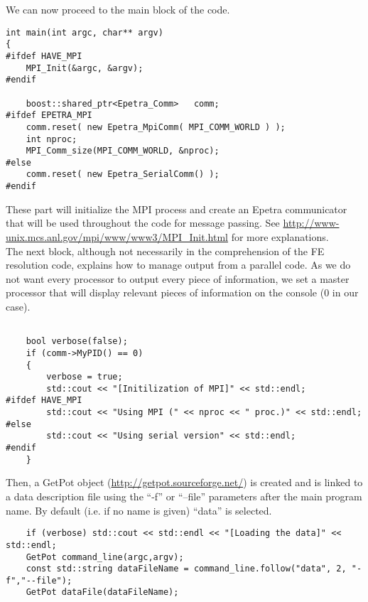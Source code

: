 We can now proceed to the main block of the code.

\begin{verbatim}
int main(int argc, char** argv)
{
#ifdef HAVE_MPI
    MPI_Init(&argc, &argv);
#endif

    boost::shared_ptr<Epetra_Comm>   comm;
#ifdef EPETRA_MPI
    comm.reset( new Epetra_MpiComm( MPI_COMM_WORLD ) );
    int nproc;
    MPI_Comm_size(MPI_COMM_WORLD, &nproc);
#else
    comm.reset( new Epetra_SerialComm() );
#endif
\end{verbatim}

\noindent These part will initialize the MPI process and create an Epetra communicator
that will be used throughout the code for message passing. See
\url{http://www-unix.mcs.anl.gov/mpi/www/www3/MPI\_Init.html}
for more explanations.\\

The next block, although not necessarily in the comprehension of the FE resolution code, explains
how to manage output from a parallel code. As we do not want every processor to output
every piece of information, we set a master processor that will display relevant
pieces of information on the console ($0$ in our case).

\begin{verbatim}

    bool verbose(false);
    if (comm->MyPID() == 0)
    {
        verbose = true;
        std::cout << "[Initilization of MPI]" << std::endl;
#ifdef HAVE_MPI
        std::cout << "Using MPI (" << nproc << " proc.)" << std::endl;
#else
        std::cout << "Using serial version" << std::endl;
#endif
    }
\end{verbatim}

\noindent Then, a GetPot object (\url{http://getpot.sourceforge.net/}) is created
and is linked to a data description file using  the ``-f'' or ``--file'' parameters after
the main program name. By default (i.e. if no name is given) ``data'' is selected.

\begin{verbatim}
    if (verbose) std::cout << std::endl << "[Loading the data]" << std::endl;
    GetPot command_line(argc,argv);
    const std::string dataFileName = command_line.follow("data", 2, "-f","--file");
    GetPot dataFile(dataFileName);
\end{verbatim}

